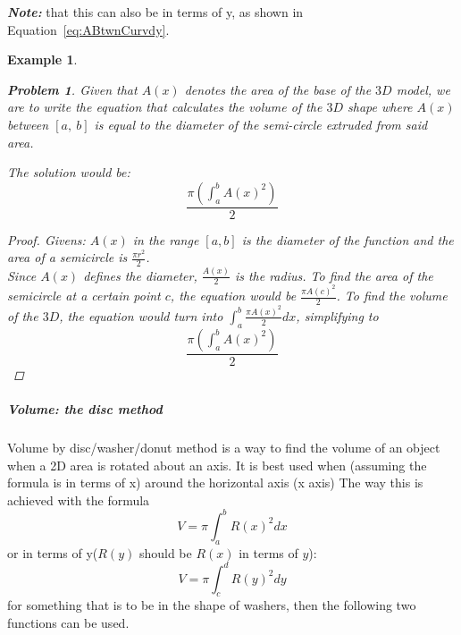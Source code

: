 \documentclass{article} %
\newtheorem{exmp}{Example}[paragraph]
\newtheorem{problem}{Problem}
\theoremstyle{theorem}
\theoremstyle{definition}
\begin{document}
                    \textbf{\textit{Note:}} that this can also be in terms of y, as shown in Equation~\ref{eq:ABtwnCurvdy}.
                    \begin{exmp}
                        \begin{problem}
                            Given that $A(x)$ denotes the area of the base of the $3D$ model, we are to write the equation that calculates the volume of the $3D$ shape where $A(x)$ between $[a,\ b]$ is equal to the diameter of the semi-circle extruded from said area.
                        \end{problem}
                        The solution would be: \[
                            \dfrac{\pi(\int_a^bA(x)^2)}{2}
                        \]
                        \begin{proof}
                            \textit{Givens}: $A(x)$ in the range $[a, b]$ is the diameter of the function and the area of a semicircle is $\frac{\pi r^2}{2}$.
                            \\Since $A(x)$ defines the diameter, $\frac{A(x)}{2}$ is the radius. To find the area of the semicircle at a certain point $c$, the equation would be $\frac{\pi A(c)^2}{2}$. To find the volume of the $3D$, the equation would turn into $\int^b_a \frac{\pi A(x)^2}{2}dx$, simplifying to 
                            $$\dfrac{\pi(\int_a^bA(x)^2)}{2}$$
                        \end{proof}
                    \end{exmp}
                \subparagraph{Volume: the disc method}
                    Volume by disc/washer/donut method is a way to find the volume of an object when a 2D area is rotated about an axis. It is best used when (assuming the formula is in terms of x) around the horizontal axis (x axis)
                    The way this is achieved with the formula 
                    \begin{equation}
                        V=\pi \int_{a}^{b}R(x)^2dx
                        \label{eq:volDiscDx}
                    \end{equation}
                    or in terms of y($R(y)$ should be $R(x)$ in terms of $y$):
                    \begin{equation}
                        V=\pi \int_{c}^{d}R(y)^2dy
                        \label{eq:volDiscDy}
                    \end{equation}
                    for something that is to be in the shape of washers, then the following two functions can be used.
\end{document}
